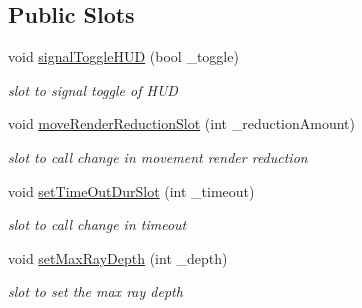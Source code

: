 \subsection*{Public Slots}
\begin{DoxyCompactItemize}
\item 
\hypertarget{class_gen_set_dock_widget_a386643c3cae291d03f1ebb51de73b5e3}{void \hyperlink{class_gen_set_dock_widget_a386643c3cae291d03f1ebb51de73b5e3}{signal\-Toggle\-H\-U\-D} (bool \-\_\-toggle)}\label{class_gen_set_dock_widget_a386643c3cae291d03f1ebb51de73b5e3}

\begin{DoxyCompactList}\small\item\em slot to signal toggle of H\-U\-D \end{DoxyCompactList}\item 
\hypertarget{class_gen_set_dock_widget_a32cd3765a3e10a384aef77177bc5eb55}{void \hyperlink{class_gen_set_dock_widget_a32cd3765a3e10a384aef77177bc5eb55}{move\-Render\-Reduction\-Slot} (int \-\_\-reduction\-Amount)}\label{class_gen_set_dock_widget_a32cd3765a3e10a384aef77177bc5eb55}

\begin{DoxyCompactList}\small\item\em slot to call change in movement render reduction \end{DoxyCompactList}\item 
\hypertarget{class_gen_set_dock_widget_a95fc0877239b23721c1d0db71793bf9e}{void \hyperlink{class_gen_set_dock_widget_a95fc0877239b23721c1d0db71793bf9e}{set\-Time\-Out\-Dur\-Slot} (int \-\_\-timeout)}\label{class_gen_set_dock_widget_a95fc0877239b23721c1d0db71793bf9e}

\begin{DoxyCompactList}\small\item\em slot to call change in timeout \end{DoxyCompactList}\item 
void \hyperlink{class_gen_set_dock_widget_a1c26ee85a7c8734aa70472466f4777a7}{set\-Max\-Ray\-Depth} (int \-\_\-depth)
\begin{DoxyCompactList}\small\item\em slot to set the max ray depth \end{DoxyCompactList}\end{DoxyCompactItemize}
